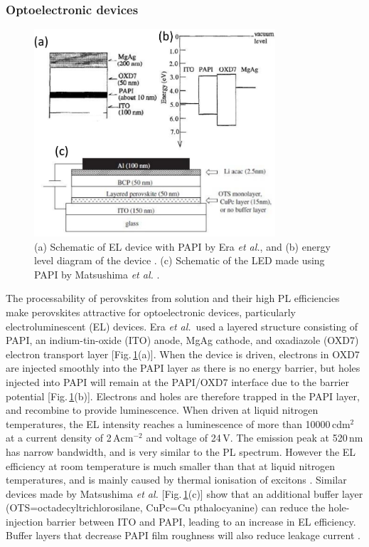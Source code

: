 \subsubsection{Optoelectronic devices}
\begin{figure}[h!]
\centering
\includegraphics[width=0.8\textwidth]{Fig22}
\caption{(a) Schematic of EL device with PAPI by Era \textit{et al.}, and (b) energy level diagram of the device \cite{Era1994}. (c) Schematic of the LED made using PAPI by Matsushima \textit{et al.} \cite{Matsushima2005}.}
\label{2Fig22}
\end{figure}
The processability of perovskites from solution and their high PL efficiencies make perovskites attractive for optoelectronic devices, particularly electroluminescent (EL) devices. Era \textit{et al.}\ used a layered structure consisting of PAPI, an indium-tin-oxide (ITO) anode, MgAg cathode, and oxadiazole (OXD7) electron transport layer [Fig.\,\ref{2Fig22}(a)]. When the device is driven, electrons in OXD7 are injected smoothly into the PAPI layer as there is no energy barrier, but holes injected into PAPI will remain at the PAPI/OXD7 interface due to the barrier potential [Fig.\,\ref{2Fig22}(b)]. Electrons and holes are therefore trapped in the PAPI layer, and recombine to provide luminescence. When driven at liquid nitrogen temperatures, the EL intensity reaches a luminescence of more than 10000\,cd$\textrm{m}^2$ at a current density of 2\,A$\textrm{cm}^{-2}$ and voltage of 24\,V. The emission peak at 520\,nm has narrow bandwidth, and is very similar to the PL spectrum. However the EL efficiency at room temperature is much smaller than that at liquid nitrogen temperatures, and is mainly caused by thermal ionisation of excitons \cite{Era1994}. Similar devices made by Matsushima \textit{et al.} [Fig.\,\ref{2Fig22}(c)] show that an additional buffer layer (OTS=octadecyltrichlorosilane, CuPc=Cu pthalocyanine) can reduce the hole-injection barrier between ITO and PAPI, leading to an increase in EL efficiency. Buffer layers that decrease PAPI film roughness will also reduce leakage current \cite{Matsushima2005}.

